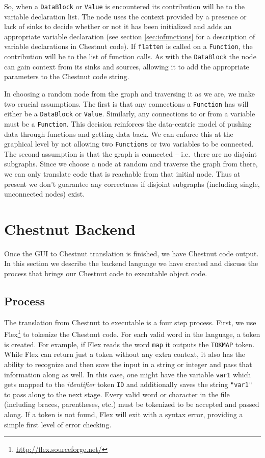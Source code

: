 \documentclass[twocolumn]{article}
\renewcommand{\|}{\origbar} %
\newcommand{\code}[1]{\texttt{#1}}
\begin{document}
So, when a \code{DataBlock} or \code{Value} is encountered its contribution will be to the variable declaration list. The node uses the context provided by a presence or lack of sinks to decide whether or not it has been initialized and adds an appropriate variable declaration (see section \ref{sec:iofunctions} for a description of variable declarations in Chestnut code). If \code{flatten} is called on a \code{Function}, the contribution will be to the list of function calls. As with the \code{DataBlock} the node can gain context from its sinks and sources, allowing it to add the appropriate parameters to the Chestnut code string.

In choosing a random node from the graph and traversing it as we are, we make two crucial assumptions. The first is that any connections a \code{Function} has will either be a \code{DataBlock} or \code{Value}. Similarly, any connections to or from a variable must be a \code{Function}. This decision reinforces the data-centric model of pushing data through functions and getting data back. We can enforce this at the graphical level by not allowing two \code{Functions} or two variables to be connected. The second assumption is that the graph is connected -- i.e.\ there are no disjoint subgraphs. Since we choose a node at random and traverse the graph from there, we can only translate code that is reachable from that initial node. Thus at present we don't guarantee any correctness if disjoint subgraphs (including single, unconnected nodes) exist.

\section{Chestnut Backend}
\label{sec:chestnutBackend}

Once the GUI to Chestnut translation is finished, we have Chestnut code output. In this section we describe the backend language we have created and discuss the process that brings our Chestnut code to executable object code.

\subsection{Process}

The translation from Chestnut to executable is a four step process. First, we use Flex\footnote{\url{http://flex.sourceforge.net/}} to tokenize the Chestnut code. For each valid word in the language, a token is created. For example, if Flex reads the word \code{map} it outputs the \code{TOKMAP} token. While Flex can return just a token without any extra context, it also has the ability to recognize and then save the input in a string or integer and pass that information along as well. In this case, one might have the variable \code{var1} which gets mapped to the {\em identifier} token \code{ID} and additionally saves the string \code{"var1"} to pass along to the next stage. Every valid word or character in the file (including braces, parentheses, etc.) must be tokenized to be accepted and passed along. If a token is not found, Flex will exit with a syntax error, providing a simple first level of error checking. 
\end{document}
